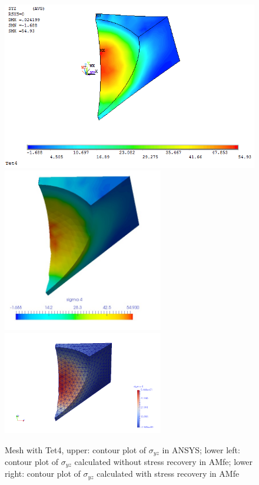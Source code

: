 \begin{figure}[htbp]
	\begin{center}
		\includegraphics[width=13cm,clip]{Tet4Syz.png} 
		\includegraphics[width=7cm,clip]{Tet4SyzPD.png} 			
		\includegraphics[width=7cm,clip]{Tet4SyzP.png} 		
		\caption{Mesh with Tet4, upper: contour plot of $\sigma_{yz}$ in ANSYS; lower left: contour plot of $\sigma_{yz}$ calculated without stress recovery in AMfe; lower right: contour plot of $\sigma_{yz}$ calculated with stress recovery in AMfe} \label{fig: Tet4_Syz}
	\end{center}
\end{figure}
\clearpage 

